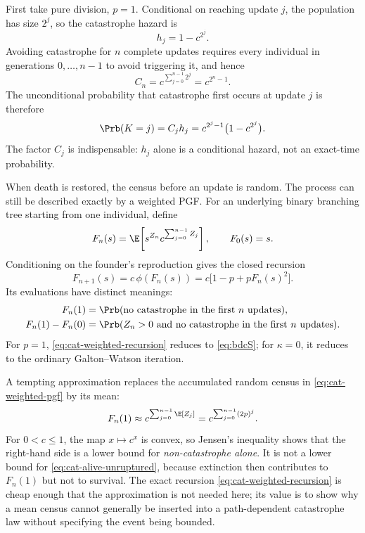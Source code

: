 First take pure division, \(p=1\).  Conditional on reaching update \(j\), the
population has size \(2^j\), so the catastrophe hazard is
\begin{equation}
  h_j=1-c^{2^j}.
  \label{eq:pure-cat-hazard}
\end{equation}
Avoiding catastrophe for \(n\) complete updates requires every individual in
generations \(0,\ldots,n-1\) to avoid triggering it, and hence
\begin{equation}
  C_n=c^{\sum_{j=0}^{n-1}2^j}=c^{2^n-1}.
  \label{eq:bdcS}
\end{equation}
The unconditional probability that catastrophe first occurs at update \(j\) is
therefore
\begin{equation}
  \Prb(K=j)=C_jh_j
  =c^{2^j-1}\bigl(1-c^{2^j}\bigr).
  \label{eq:pure-cat-mass}
\end{equation}
The factor \(C_j\) is indispensable: \(h_j\) alone is a conditional hazard, not an
exact-time probability.

When death is restored, the census before an update is random.  The process can
still be described exactly by a weighted PGF.  For an underlying binary branching
tree starting from one individual, define
\begin{equation}
  F_n(s)=
  \E\!\left[
    s^{Z_n}c^{\sum_{j=0}^{n-1}Z_j}
  \right],
  \qquad F_0(s)=s.
  \label{eq:cat-weighted-pgf}
\end{equation}
Conditioning on the founder's reproduction gives the closed recursion
\begin{equation}
  F_{n+1}(s)
  =c\,\phi(F_n(s))
  =c\bigl[1-p+pF_n(s)^2\bigr].
  \label{eq:cat-weighted-recursion}
\end{equation}
Its evaluations have distinct meanings:
\begin{align}
  F_n(1)
  &=\Prb(\text{no catastrophe in the first }n\text{ updates}),
  \label{eq:cat-no-rupture}\\
  F_n(1)-F_n(0)
  &=\Prb(Z_n>0\ \text{and no catastrophe in the first }n\text{ updates}).
  \label{eq:cat-alive-unruptured}
\end{align}
For \(p=1\), \eqref{eq:cat-weighted-recursion} reduces to
\eqref{eq:bdcS}; for \(\kappa=0\), it reduces to the ordinary
Galton--Watson iteration.

A tempting approximation replaces the accumulated random census in
\eqref{eq:cat-weighted-pgf} by its mean:
\begin{equation}
  F_n(1)\approx
  c^{\sum_{j=0}^{n-1}\E[Z_j]}
  =c^{\sum_{j=0}^{n-1}(2p)^j}.
  \label{eq:bdcguess}
\end{equation}
For \(0<c\leq1\), the map \(x\mapsto c^x\) is convex, so Jensen's inequality
shows that the right-hand side is a lower bound for
\emph{non-catastrophe alone}.  It is not a lower bound for
\eqref{eq:cat-alive-unruptured}, because extinction then contributes to
\(F_n(1)\) but not to survival.  The exact recursion
\eqref{eq:cat-weighted-recursion} is cheap enough that the approximation is not
needed here; its value is to show why a mean census cannot generally be inserted
into a path-dependent catastrophe law without specifying the event being bounded.

